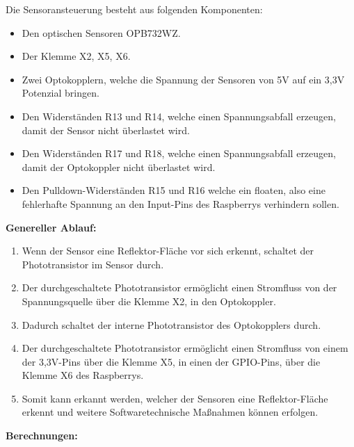 Die Sensoransteuerung besteht aus folgenden Komponenten:
\begin{itemize}
\item Den optischen Sensoren OPB732WZ.
\item Der Klemme X2, X5, X6. 
\item Zwei Optokopplern, welche die Spannung der Sensoren von 5V auf ein 3,3V Potenzial bringen.
\item Den Widerständen R13 und R14, welche einen Spannungsabfall erzeugen, damit der Sensor nicht überlastet wird.
\item Den Widerständen R17 und R18, welche einen Spannungsabfall erzeugen, damit der Optokoppler nicht überlastet wird.
\item Den Pulldown-Widerständen R15 und R16 welche ein floaten, also eine fehlerhafte Spannung an den Input-Pins des Raspberrys verhindern sollen.\\
\end{itemize}
\newpage
\textbf{Genereller Ablauf:}
\begin{enumerate}
\item Wenn der Sensor eine Reflektor-Fläche vor sich erkennt, schaltet der Phototransistor im Sensor durch.
\item Der durchgeschaltete Phototransistor ermöglicht einen Stromfluss von der Spannungsquelle über die Klemme X2, in den Optokoppler.
\item Dadurch schaltet der interne Phototransistor des Optokopplers durch.
\item Der durchgeschaltete Phototransistor ermöglicht einen Stromfluss von einem der 3,3V-Pins über die Klemme X5, in einen der GPIO-Pins, über die Klemme X6 des Raspberrys.
\item Somit kann erkannt werden, welcher der Sensoren eine Reflektor-Fläche erkennt und weitere Softwaretechnische Maßnahmen können erfolgen.
\end{enumerate}
\textbf{Berechnungen:}
